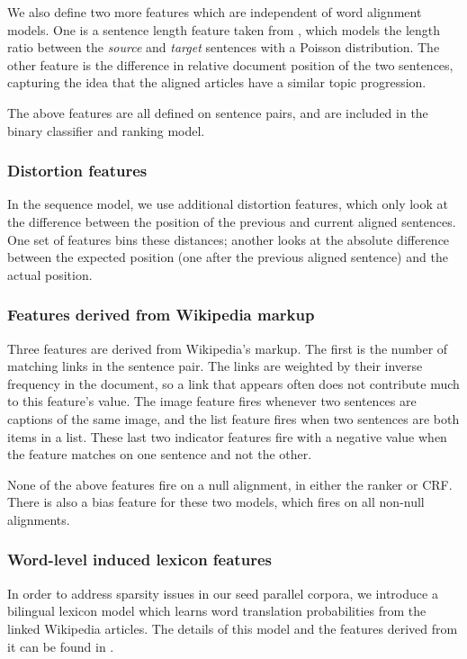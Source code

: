 \documentclass[11pt,letterpaper]{article}
\begin{document}
We also define two more features which are independent of word alignment
models.  One is a sentence length feature taken from \cite{Moore02}, which
models the length ratio between the {\em source} and {\em target} sentences with
a Poisson distribution.  The other feature is the difference in relative
document position of the two sentences, capturing the idea that the aligned
articles have a similar topic progression.

The above features are all defined on sentence pairs, and are included in the
binary classifier and ranking model.
\subsubsection*{Distortion features} In the sequence model, we use additional distortion
features, which only look at the difference between the position
of the previous and current aligned sentences.  One set of
features bins these distances; another looks at the
absolute difference between the expected position (one after the
previous aligned sentence) and the actual position.

\subsubsection*{Features derived from Wikipedia markup}

Three features are derived from Wikipedia's
markup. The first is the number of matching links in the sentence
pair. The links are weighted by their inverse frequency in the
document, so a link that appears often does not contribute much to
this feature's value.  The image feature fires whenever two
sentences are captions of the same image, and the list feature
fires when two sentences are both items in a list.  These last two
indicator features fire with a negative value when the feature
matches on one sentence and not the other.

None of the above features fire on a null alignment, in either the
ranker or CRF.  There is also a bias feature for these two models, which
fires on all non-null alignments.

\subsubsection*{Word-level induced lexicon features}
In order to address sparsity issues in our seed parallel corpora, we introduce a
bilingual lexicon model which learns word translation probabilities from the
linked Wikipedia articles. The details of this model and the features derived
from it can be found in \cite{Smith10}.
\end{document}
